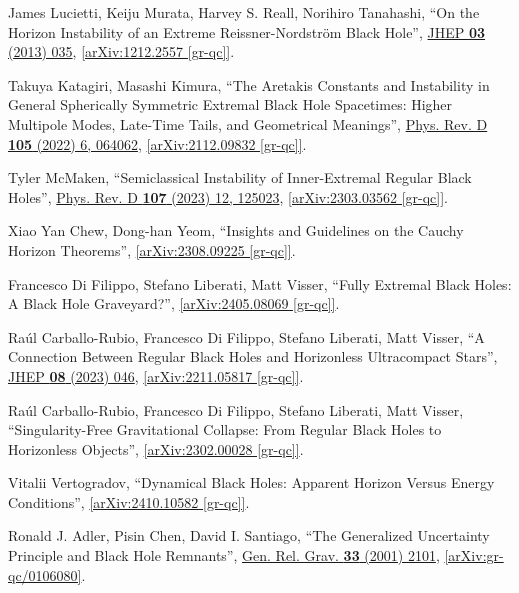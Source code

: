 \documentclass[12pt,preprintnumbers, floatfix, preprintnumbers, letterpaper, superscriptaddress,nofootinbib]{revtex4-2}
\begin{document}
\begin{thebibliography}{99}
James Lucietti, Keiju Murata, Harvey S. Reall, Norihiro Tanahashi, ``On the Horizon Instability of an Extreme Reissner-Nordström Black Hole'', {\href{https://link.springer.com/article/10.1007/JHEP03(2013)035}{JHEP \textbf{03} (2013) 035}}, \href{https://arxiv.org/abs/1212.2557}{[arXiv:1212.2557 [gr-qc]]}. 

Takuya Katagiri, Masashi Kimura, ``The Aretakis Constants and Instability in General Spherically Symmetric Extremal Black Hole Spacetimes: Higher Multipole Modes, Late-Time Tails, and Geometrical Meanings'', {\href{https://journals.aps.org/prd/abstract/10.1103/PhysRevD.105.064062}{Phys. Rev. D \textbf{105} (2022) 6, 064062}}, \href{https://arxiv.org/abs/2112.09832}{[arXiv:2112.09832 [gr-qc]]}.

Tyler McMaken, ``Semiclassical Instability of Inner-Extremal Regular Black Holes'', {\href{https://journals.aps.org/prd/abstract/10.1103/PhysRevD.107.125023}{Phys. Rev. D \textbf{107} (2023) 12, 125023}}, \href{https://arxiv.org/abs/2303.03562}{[arXiv:2303.03562 [gr-qc]]}.

Xiao Yan Chew, Dong-han Yeom, ``Insights and Guidelines on the Cauchy Horizon Theorems'', \href{https://arxiv.org/abs/2308.09225}{[arXiv:2308.09225 [gr-qc]]}.

Francesco Di Filippo, Stefano Liberati, Matt Visser, ``Fully Extremal Black Holes: A Black Hole Graveyard?'', \href{https://arxiv.org/abs/2405.08069}{[arXiv:2405.08069 [gr-qc]]}.

Raúl Carballo-Rubio, Francesco Di Filippo, Stefano Liberati, Matt Visser, ``A Connection Between Regular Black Holes and Horizonless Ultracompact Stars'', {\href{https://link.springer.com/article/10.1007/JHEP08(2023)046}{JHEP \textbf{08} (2023) 046}}, \href{https://arxiv.org/abs/2211.05817}{[arXiv:2211.05817 [gr-qc]]}.

Raúl Carballo-Rubio, Francesco Di Filippo, Stefano Liberati, Matt Visser, ``Singularity-Free Gravitational Collapse: From Regular Black Holes to Horizonless Objects'', \href{https://arxiv.org/abs/2302.00028}{[arXiv:2302.00028 [gr-qc]]}.

Vitalii Vertogradov, ``Dynamical Black Holes: Apparent Horizon Versus Energy Conditions'', \href{https://arxiv.org/abs/2410.10582}{[arXiv:2410.10582 [gr-qc]]}.

Ronald J. Adler, Pisin Chen, David I. Santiago, ``The Generalized Uncertainty Principle and Black Hole Remnants'', {\href{https://link.springer.com/article/10.1023/A:1015281430411}{Gen. Rel. Grav. \textbf{33} (2001) 2101}}, \href{https://arxiv.org/abs/gr-qc/0106080}{[arXiv:gr-qc/0106080]}.


\end{thebibliography}
\end{document}
